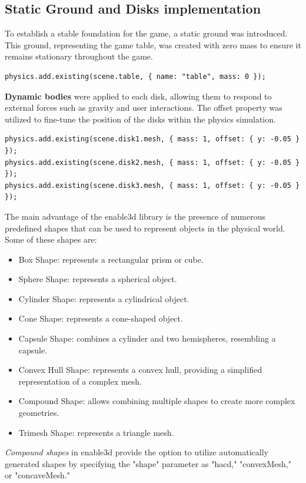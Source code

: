 \documentclass{article}
\begin{document}
\subsection{Static Ground and Disks implementation}
To establish a stable foundation for the game, a static ground was introduced. \\
This ground, representing the game table, was created with zero mass to ensure it remains stationary throughout the game.

\begin{lstlisting}
physics.add.existing(scene.table, { name: "table", mass: 0 });  
\end{lstlisting}
\textbf{Dynamic bodies} were applied to each disk, allowing them to respond to external forces such as gravity and user interactions. The offset property was utilized to fine-tune the position of the disks within the physics simulation.
\begin{lstlisting}
physics.add.existing(scene.disk1.mesh, { mass: 1, offset: { y: -0.05 } });
physics.add.existing(scene.disk2.mesh, { mass: 1, offset: { y: -0.05 } });
physics.add.existing(scene.disk3.mesh, { mass: 1, offset: { y: -0.05 } });
\end{lstlisting}
The main advantage of the enable3d library is the presence of numerous predefined shapes that can be used to represent objects in the physical world. Some of these shapes are:
\begin{itemize}
    \item Box Shape: represents a rectangular prism or cube.
    \item Sphere Shape: represents a spherical object.
    \item Cylinder Shape: represents a cylindrical object.
    \item Cone Shape: represents a cone-shaped object.
    \item Capsule Shape: combines a cylinder and two hemispheres, resembling a capsule.
    \item Convex Hull Shape: represents a convex hull, providing a simplified representation of a complex mesh.
    \item Compound Shape: allows combining multiple shapes to create more complex geometries.
    \item Trimesh Shape: represents a triangle mesh.
\end{itemize}
\textit{Compound shapes} in enable3d provide the option to utilize automatically generated shapes by specifying the "shape" parameter as "hacd," "convexMesh," or "concaveMesh."
\end{document}
